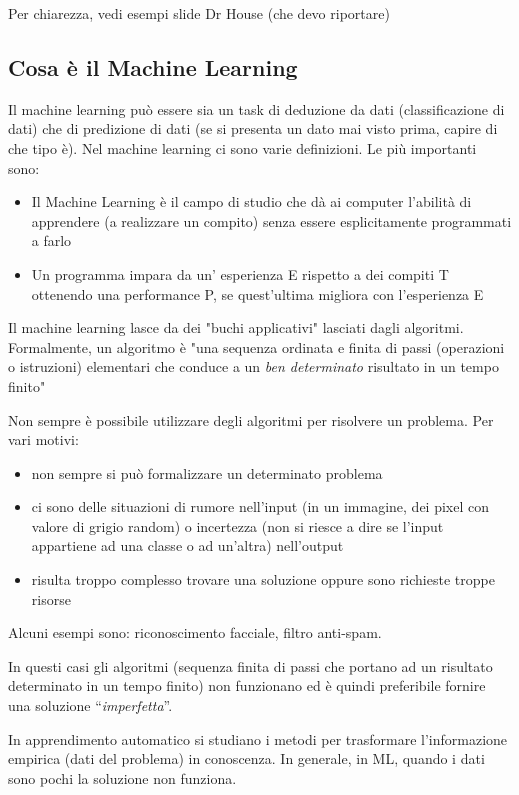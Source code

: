Per chiarezza, vedi esempi slide Dr House (che devo riportare)

\subsection{Cosa è il Machine Learning}
Il machine learning può essere sia un task di deduzione da dati (classificazione di dati) che di predizione di dati (se si presenta un dato mai visto prima, capire di che tipo è).
Nel machine learning ci sono varie definizioni. Le più importanti sono:
\begin{itemize}
  \item Il Machine Learning è il campo di
  studio che dà ai computer l’abilità di
  apprendere (a realizzare un compito)
  senza essere esplicitamente
  programmati a farlo
  \item Un programma impara da un’
  esperienza E rispetto a dei compiti T
  ottenendo una performance P, se
  quest’ultima migliora con l’esperienza E
\end{itemize}
Il machine learning lasce da dei "buchi applicativi" lasciati dagli algoritmi. Formalmente, un algoritmo è "una sequenza ordinata e finita di passi (operazioni o istruzioni) elementari che conduce a un \emph{ben determinato} risultato in un tempo finito"


Non sempre è possibile utilizzare degli algoritmi per risolvere un problema.
Per vari motivi:

\begin{itemize}
\item non sempre si può formalizzare un determinato problema
\item ci sono delle situazioni di rumore nell'input (in un immagine, dei pixel con valore di grigio random) o incertezza (non si riesce a dire se l'input appartiene ad una classe o ad un'altra) nell'output
\item risulta troppo complesso trovare una soluzione oppure sono richieste troppe risorse
\end{itemize}

Alcuni esempi sono: riconoscimento facciale, filtro anti-spam.

In questi casi gli algoritmi (sequenza finita di passi che portano ad un risultato determinato in un tempo finito) non funzionano ed è quindi preferibile fornire una soluzione ``\emph{imperfetta}''.

In apprendimento automatico si studiano i metodi per trasformare l'informazione empirica (dati del problema) in conoscenza. In generale, in ML, quando i dati sono pochi la soluzione non funziona.

